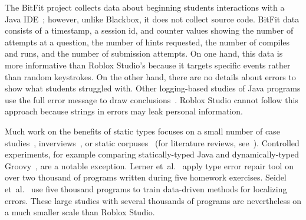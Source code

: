 \documentclass[english,submission,cleveref]{programming}
\begin{document}
The BitFit project collects data about beginning students interactions with a
Java IDE~\cite{ekc-wccce-2016,anna-russo-kennedy-ms-2006}; however, unlike Blackbox, it does
not collect source code.
BitFit data consists of a timestamp, a session id, and counter values showing
the number of attempts at a question, the number of hints requested, the number
of compiles and runs, and the number of submission attempts.
On one hand, this data is more informative than Roblox Studio's because it
targets specific events rather than random keystrokes.
On the other hand, there are no details about errors to show what students
struggled with.
Other logging-based studies of Java programs use the full error message to
draw conclusions~\cite{bgimgm-cse-2016,dlc-iticse-2014}.
Roblox Studio cannot follow this approach because strings in errors may leak
personal information.

Much work on the benefits of static types focuses on a small number
of case studies~\cite{w-popl-1986,hw-scp-2004,td-tosem-2001},
inverviews~\cite{cdhhjklwya-hatra-2020,gstf-hatra-2021,cams-oopsla-2020},
or static corpuses~\cite{rppd-fse-2014,bhmvv-toplas-2019,bmvv-arxiv-2019}
(for literature reviews, see~\cite{empirical-types,heeren-thesis}).
Controlled experiments, for example comparing statically-typed Java and dynamically-typed
Groovy~\cite{khrts-icpc-2012}, are a notable exception.
Lerner et~al.~\cite{lfgc-pldi-2007} apply type error repair tool on over two thousand
of programs written during five homework exercises.
Seidel et~al.~\cite{sscwj-oopsla-2017,sjw-jfp-2018} use five thousand programs
to train data-driven methods for localizing errors.
These large studies with several thousands of programs are
nevertheless on a much smaller scale than Roblox Studio.

%
%
%
%
%


\end{document}
